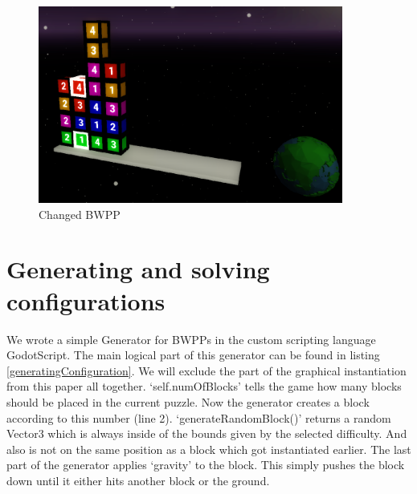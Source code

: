\documentclass[runningheads]{llncs}
\begin{document}
        \begin{figure}[h]
            \centering
            \includegraphics[width=10cm]{colorizedBlocks.png}
            \caption{Changed BWPP}
            \label{colorizedBlocks}
        \end{figure} 

    \section{Generating and solving configurations}
        We wrote a simple Generator for BWPPs in the custom scripting language GodotScript.
        The main logical part of this generator can be found in listing \ref{generatingConfiguration}.
        We will exclude the part of the graphical instantiation from this paper all together. \newline
        `self.numOfBlocks' tells the game how many blocks should be placed in the current puzzle. 
        Now the generator creates a block according to this number (line 2).
        `generateRandomBlock()' returns a random Vector3 which is always inside of the bounds given by the selected difficulty.
        And also is not on the same position as a block which got instantiated earlier.\newline
        The last part of the generator applies `gravity' to the block.
        This simply pushes the block down until it either hits another block or the ground.
\end{document}
